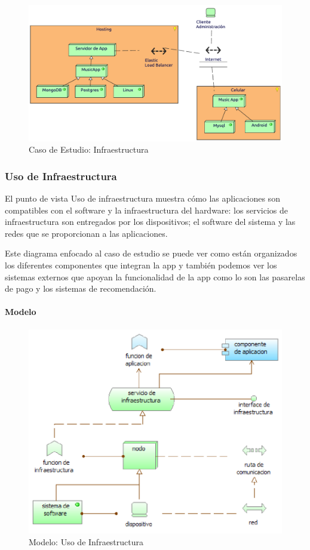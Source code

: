 \begin{figure}[h!]
	\centering
	\includegraphics[width=\linewidth]{Desarrollo/ArquitecturaEmpresarial/Tecnologia/imgs/insfraestructura.pdf}
	\caption{Caso de Estudio: Infraestructura}
\end{figure}

\newpage

\subsubsection{Uso de Infraestructura}
El punto de vista Uso de infraestructura muestra cómo las aplicaciones son compatibles con el software y la infraestructura del hardware: los servicios de infraestructura son entregados por los dispositivos; el software del sistema y las redes que se proporcionan a las aplicaciones.  \vspace{\baselineskip}

Este diagrama enfocado al caso de estudio se puede ver como están organizados los diferentes componentes que integran la app y también podemos ver los sistemas externos que apoyan la funcionalidad de la app como lo son las pasarelas de pago y los sistemas de recomendación.
\paragraph{Modelo}
\begin{figure}[h!]
	\centering
	\includegraphics[width=0.8\linewidth]{Desarrollo/ArquitecturaEmpresarial/Tecnologia/imgs/uso.PNG}
	\caption{Modelo: Uso de Infraestructura}
\end{figure}
\newpage
